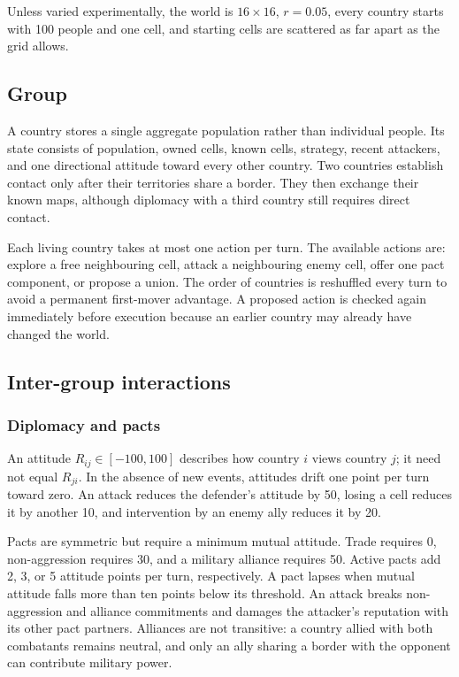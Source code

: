 \documentclass[10pt,twocolumn]{article}
\begin{document}
Unless varied experimentally, the world is $16\times16$, $r=0.05$, every
country starts with 100 people and one cell, and starting cells are scattered
as far apart as the grid allows.

\subsection{Group}

A country stores a single aggregate population rather than individual people.
Its state consists of population, owned cells, known cells, strategy, recent
attackers, and one directional attitude toward every other country.  Two
countries establish contact only after their territories share a border.
They then exchange their known maps, although diplomacy with a third country
still requires direct contact.

Each living country takes at most one action per turn.  The available actions
are: explore a free neighbouring cell, attack a neighbouring enemy cell,
offer one pact component, or propose a union.  The order of countries is
reshuffled every turn to avoid a permanent first-mover advantage.  A proposed
action is checked again immediately before execution because an earlier
country may already have changed the world.

\subsection{Inter-group interactions}

\subsubsection{Diplomacy and pacts}

An attitude $R_{ij}\in[-100,100]$ describes how country $i$ views country
$j$; it need not equal $R_{ji}$.  In the absence of new events, attitudes
drift one point per turn toward zero.  An attack reduces the defender's
attitude by 50, losing a cell reduces it by another 10, and intervention by
an enemy ally reduces it by 20.

Pacts are symmetric but require a minimum mutual attitude.  Trade requires
0, non-aggression requires 30, and a military alliance requires 50.  Active
pacts add 2, 3, or 5 attitude points per turn, respectively.  A pact lapses
when mutual attitude falls more than ten points below its threshold.  An
attack breaks non-aggression and alliance commitments and damages the
attacker's reputation with its other pact partners.  Alliances are not
transitive: a country allied with both combatants remains neutral, and only
an ally sharing a border with the opponent can contribute military power.
\end{document}
